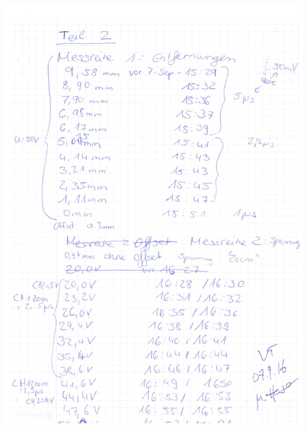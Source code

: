 \documentclass[12pt]{article}
\begin{document}
\begin{minipage}{\textwidth}
	\centering
	\includegraphics[width=\textwidth]{figures/Buch3.pdf}
\end{minipage}
%


%


\end{document}
